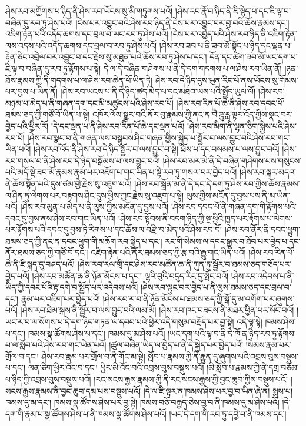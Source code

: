 ཤེས་རབ་མགྱོགས་པ་ཉིད་ནི་ཤེས་རབ་ཡོངས་སུ་མི་གཏུགས་པའོ། །ཤེས་རབ་རྣོ་བ་ཉིད་ནི་ཇི་སྙེད་པ་དང་ཇི་ལྟ་བ་བཞིན་དུ་རབ་ཏུ་ཤེས་པའོ། །ངེས་པར་འབྱུང་བའི་ཤེས་རབ་ཉིད་ནི་ངེས་པར་འབྱུང་བར་བྱ་བའི་ཆོས་རྣམས་དང་། འཇིག་རྟེན་པའི་འདོད་ཆགས་དང་བྲལ་བ་ཡང་རབ་ཏུ་ཤེས་པའོ། །ངེས་པར་འབྱེད་པའི་ཤེས་རབ་ཉིད་ནི་འཇིག་རྟེན་ལས་འདས་པའི་འདོད་ཆགས་དང་བྲལ་བ་རབ་ཏུ་ཤེས་པའོ། །ཤེས་རབ་ཟབ་པ་ནི་ཟབ་མོ་སྟོང་པ་ཉིད་དང་ལྡན་པ་རྟེན་ཅིང་འབྲེལ་བར་འབྱུང་བ་དང་རྗེས་སུ་མཐུན་པའི་ཆོས་རབ་ཏུ་ཤེས་པ་དང་། དོན་དང་ཚིག་ཟབ་མོ་ཡང་དག་པ་ཇི་ལྟ་བ་བཞིན་དུ་རབ་ཏུ་རྟོགས་པ་སྟེ། དེ་ལ་དེ་བཞིན་གཤེགས་པ་ནི་དེ་དག་གདགས་པ་ལ་ཤེས་རབ་ཡིན་ནོ། །ཉན་ཐོས་རྣམས་ཀྱི་ནི་གདགས་པ་ལ་ཤེས་རབ་ཆེན་པོ་ཡིན་ཏེ། ཤེས་རབ་དེ་ཉིད་དུས་ཡུན་རིང་པོ་ནས་ཡོངས་སུ་གོམས་པར་བྱས་པ་ཡིན་ནོ། །ཤེས་རབ་ཡངས་པ་ནི་དེ་ཉིད་ཚད་མེད་པ་དང་མཐའ་ཡས་པའི་སྤྱོད་ཡུལ་ལོ། །ཤེས་རབ་མཉམ་པ་མེད་པ་ནི་གཞན་དག་དང་མི་མཚུངས་པའི་ཤེས་རབ་པོ། །ཤེས་རབ་རིན་པོ་ཆེ་ནི་ཤེས་རབ་དབང་པོ་ཐམས་ཅད་ཀྱི་གཙོ་བོ་ཡིན་པ་སྟེ། འཁོར་ལོས་སྒྱུར་བའི་ནོར་བུ་རྣམས་ཀྱི་ནང་ན་བཻ་ཌཱུ་ཪྻ་ལྟར་འོད་ཀྱིས་སྣང་བར་བྱེད་པའི་ཕྱིར་རོ། །དེ་དང་ལྡན་པ་ནི་ཤེས་རབ་རིན་པོ་ཆེ་དང་ལྡན་པའོ། །ཤེས་རབ་མིག་ནི་ལྷན་ཅིག་སྐྱེས་པའི་ཤེས་རབ་པོ། །ཤེས་རབ་སྣང་བ་ནི་གཞན་ལས་བསྒྲུབས་ཤིང་གཞན་གྱིས་སྐྱེད་པ་སྦྱོར་བ་ལས་བྱུང་བའི་ཤེས་རབ་གང་ཡིན་པའོ། །ཤེས་རབ་འོད་ནི་ཤེས་རབ་དེ་ཉིད་སྦྱོར་བ་ལས་བྱུང་བ་སྟེ། ཐོས་པ་དང་བསམས་པ་ལས་བྱུང་བའོ། །ཤེས་རབ་གསལ་བ་ནི་ཤེས་རབ་དེ་ཉིད་བསྒོམས་པ་ལས་བྱུང་བའོ། །ཤེས་རབ་མར་མེ་ནི་དེ་བཞིན་གཤེགས་པས་གསུངས་པའི་མདོ་སྡེ་ཟབ་མོ་རྣམས་རྣམ་པར་འཇོག་པ་གང་ཡིན་པ་སྟེ་རབ་ཏུ་གསལ་བར་བྱེད་པའོ། །ཤེས་རབ་སྐར་མདའ་ནི་ཆོས་སྟོན་པའི་དུས་ཙམ་གྱི་རྗེས་སུ་འཇུག་པའོ། །ཤེས་རབ་སྒྲོན་མ་ནི་དེ་དང་དེ་དག་ཏུ་ཤེས་རབ་ཀྱིས་ཆོས་རྣམས་ལ་ཤིན་ཏུ་ལེགས་པར་བརྟགས་ཤིང་དུས་ཕྱིས་ཀྱང་རྗེས་སུ་འཇུག་པ་སྟེ། ལུས་ཀྱིས་མངོན་དུ་བྱས་པས་ནི་མ་ཡིན་པའོ། །ཤེས་རབ་མུན་པ་མེད་པ་ནི་ལུས་ཀྱིས་མངོན་དུ་བྱས་པའོ། །ཤེས་རབ་དབང་པོ་ནི་གཞན་དག་གི་རྟོགས་པའི་དབང་དུ་བྱས་ནས་ཤེས་རབ་གང་ཡིན་པའོ། །ཤེས་རབ་སྟོབས་ནི་བདག་ཉིད་ཀྱི་སྔ་ཕྱིའི་ཁྱད་པར་རྟོགས་པ་ལེགས་པར་རྟོགས་པའི་དབང་དུ་བྱས་ཏེ་རིགས་པ་དང་ཆོས་ལ་བརྫི་བ་མེད་པའི་ཤེས་རབ་བོ། །ཤེས་རབ་ནོར་ནི་དབང་ཕྱུག་ཐམས་ཅད་ཀྱི་ནང་ན་དབང་ཕྱུག་གི་མཆོག་རབ་སྐྱེད་པ་དང་། རང་གི་སེམས་ལ་དབང་སྒྱུར་བ་ཐོབ་པར་བྱེད་པ་དང་ནོར་ཐམས་ཅད་ཀྱི་གཙོ་བོ་དང་། འཇིག་རྟེན་པའི་ནོར་ཐམས་ཅད་ཀྱི་རྩ་བའི་རྒྱུ་གང་ཡིན་པའོ། །ཤེས་རབ་རིན་པོ་ཆེ་ནི་ཇི་སྐད་དུ་བཤད་པའོ། །ཤེས་རབ་རལ་གྲི་དང་ཤེས་རབ་མཚོན་ཆ་ནི་ཀུན་ཏུ་སྦྱོར་བ་ཐམས་ཅད་གཅོད་པར་བྱེད་པའོ། །ཤེས་རབ་མཚོན་ཆ་ནི་ཉོན་མོངས་པ་དང་། ལྷའི་བུའི་བདུད་རིང་དུ་སྤོང་བའོ། །ཤེས་རབ་འདེབས་པ་ནི་ཡིད་ཀྱི་དབང་པོའི་རྟ་དགེ་བ་སྤྱོད་པར་འདེབས་པའོ། །ཤེས་རབ་ལྟུང་བར་བྱེད་པ་ནི་ལུས་ཐམས་ཅད་དང་བྲལ་བ་དང་། རྣམ་པར་འཇིག་པར་བྱེད་པའོ། །ཤེས་རབ་ར་བ་ནི་ཉོན་མོངས་པ་ཐམས་ཅད་ཀྱི་སྒོ་དུ་མ་འགོག་པར་ཞུགས་པའོ། །ཤེས་རབ་ཐེམ་སྐས་ནི་སྦྱོར་བ་ལས་བྱུང་བའི་ལམ་མོ། །ཤེས་རབ་ཁང་བཟངས་ནི་མཐར་ཕྱིན་པར་སོང་བའོ། །ཡང་ར་བ་ལ་སོགས་པ་དེ་དག་ཉིད་གཏན་ལ་དབབ་པའི་ཕྱིར་འདི་གསུམ་བརྗོད་པར་བྱ་སྟེ། འདི་ལྟ་སྟེ། ཁམས་ཤེས་པ་དང་། ཁམས་སྣ་ཚོགས་ཤེས་པ་དང་། ཁམས་དུ་མ་ཤེས་པའོ། །ཡང་དག་པའི་ལྟ་བ་ནི་དེ་ཁོ་ན་ཉིད་རབ་ཏུ་རྟོགས་པ་ལ་སློབ་པའི་ཤེས་རབ་གང་ཡིན་པའོ། །ཚུལ་བཞིན་ཡིད་ལ་བྱེད་པ་ནི་དེ་སྐྱེད་པར་བྱེད་པའོ། །སེམས་རྣམ་པར་གྲོལ་བ་དང་། ཤེས་རབ་རྣམ་པར་གྲོལ་བ་ནི་གོང་མ་སྟེ། སློབ་པ་རྣམས་ཀྱི་ནི་རྒྱུན་དུ་ཞུགས་པའི་འབྲས་བུས་བསྡུས་པ་དང་། ལན་ཅིག་ཕྱིར་འོང་བ་དང་། ཕྱིར་མི་འོང་བའི་འབྲས་བུས་བསྡུས་པའོ། །མི་སློབ་པ་རྣམས་ཀྱི་ནི་དགྲ་བཅོམ་པ་ཉིད་ཀྱི་འབྲས་བུས་བསྡུས་པའོ། །རང་སངས་རྒྱས་རྣམས་ཀྱི་ནི་རང་སངས་རྒྱས་ཀྱི་བྱང་ཆུབ་ཀྱིས་བསྡུས་པའོ། །སངས་རྒྱས་རྣམས་ནི་བྱང་ཆུབ་དམ་པས་བསྡུས་པའོ། །དེ་ལ་ཇི་ལྟར་ན་ཁམས་ཤེས་པར་བྱ་བ་ཡིན་ཞེ་ན། སྨྲས་པ། ཁམས་དུ་མ་དང་། ཁམས་སྣ་ཚོགས་ཤེས་པར་བྱ་སྟེ། ཁམས་བཅོ་བརྒྱད་ཅེས་བྱ་བ་ནི་ཁམས་དུ་མ་ཤེས་པའོ། །དེ་དག་གི་རྣམ་པ་སྣ་ཚོགས་ཤེས་པ་ནི་ཁམས་སྣ་ཚོགས་ཤེས་པའོ། །ཡང་དེ་དག་གི་རབ་ཏུ་དབྱེ་བ་ནི་ཁམས་དང་། 